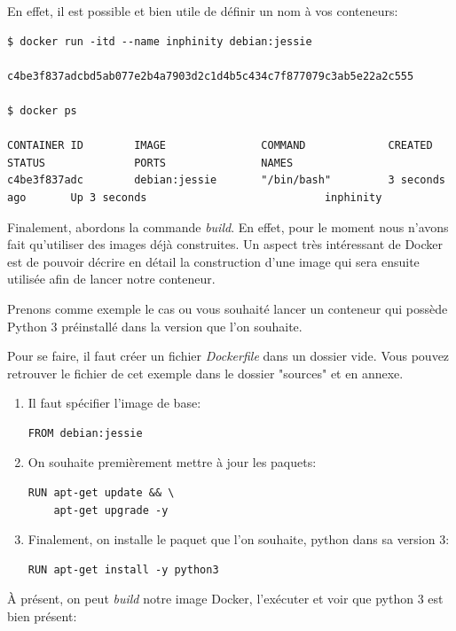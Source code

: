En effet, il est possible et bien utile de définir un nom à vos conteneurs:

\begin{lstlisting}[frame=single]
$ docker run -itd --name inphinity debian:jessie

c4be3f837adcbd5ab077e2b4a7903d2c1d4b5c434c7f877079c3ab5e22a2c555

$ docker ps

CONTAINER ID        IMAGE               COMMAND             CREATED             STATUS              PORTS               NAMES
c4be3f837adc        debian:jessie       "/bin/bash"         3 seconds ago       Up 3 seconds                            inphinity
\end{lstlisting}

Finalement, abordons la commande \emph{build}. En effet, pour le moment nous n'avons fait qu'utiliser des images déjà construites. Un aspect très intéressant de Docker est de pouvoir décrire en détail la construction d'une image qui sera ensuite utilisée afin de lancer notre conteneur.

Prenons comme exemple le cas ou vous souhaité lancer un conteneur qui possède Python 3 préinstallé dans la version que l'on souhaite.

Pour se faire, il faut créer un fichier \emph{Dockerfile} dans un dossier vide. Vous pouvez retrouver le fichier de cet exemple dans le dossier "sources" et en annexe.

\begin{enumerate}
\item Il faut spécifier l'image de base:
\begin{lstlisting}[frame=single]
FROM debian:jessie
\end{lstlisting}

\item On souhaite premièrement mettre à jour les paquets:
\begin{lstlisting}[frame=single]
RUN apt-get update && \
    apt-get upgrade -y
\end{lstlisting}

\item Finalement, on installe le paquet que l'on souhaite, python dans sa version 3:
\begin{lstlisting}[frame=single]
RUN apt-get install -y python3
\end{lstlisting}

\end{enumerate}

À présent, on peut \emph{build} notre image Docker, l'exécuter et voir que python 3 est bien présent:

